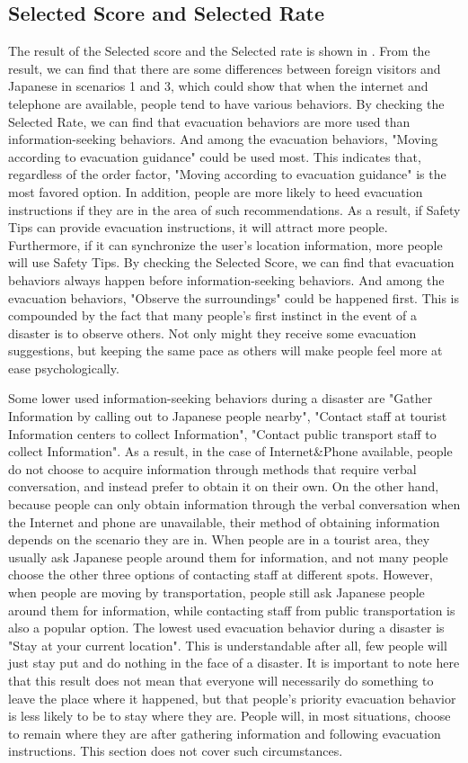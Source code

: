 \subsection{Selected Score and Selected Rate}
The result of the Selected score and the Selected rate is shown in . From the result, we can find that there are some differences between foreign visitors and Japanese in scenarios 1 and 3, which could show that when the internet and telephone are available, people tend to have various behaviors. By checking the Selected Rate, we can find that evacuation behaviors are more used than information-seeking behaviors. And among the evacuation behaviors, "Moving according to evacuation guidance" could be used most. This indicates that, regardless of the order factor, "Moving according to evacuation guidance" is the most favored option. In addition, people are more likely to heed evacuation instructions if they are in the area of such recommendations. As a result, if Safety Tips can provide evacuation instructions, it will attract more people. Furthermore, if it can synchronize the user's location information, more people will use Safety Tips. By checking the Selected Score, we can find that evacuation behaviors always happen before information-seeking behaviors. And among the evacuation behaviors, "Observe the surroundings" could be happened first. This is compounded by the fact that many people's first instinct in the event of a disaster is to observe others. Not only might they receive some evacuation suggestions, but keeping the same pace as others will make people feel more at ease psychologically.

Some lower used information-seeking behaviors during a disaster are "Gather Information by calling out to Japanese people nearby", "Contact staff at tourist Information centers to collect Information", "Contact public transport staff to collect Information". As a result, in the case of Internet\&Phone available, people do not choose to acquire information through methods that require verbal conversation, and instead prefer to obtain it on their own. On the other hand, because people can only obtain information through the verbal conversation when the Internet and phone are unavailable, their method of obtaining information depends on the scenario they are in. When people are in a tourist area, they usually ask Japanese people around them for information, and not many people choose the other three options of contacting staff at different spots. However, when people are moving by transportation, people still ask Japanese people around them for information, while contacting staff from public transportation is also a popular option. The lowest used evacuation behavior during a disaster is "Stay at your current location". This is understandable after all, few people will just stay put and do nothing in the face of a disaster. It is important to note here that this result does not mean that everyone will necessarily do something to leave the place where it happened, but that people's priority evacuation behavior is less likely to be to stay where they are. People will, in most situations, choose to remain where they are after gathering information and following evacuation instructions. This section does not cover such circumstances.

